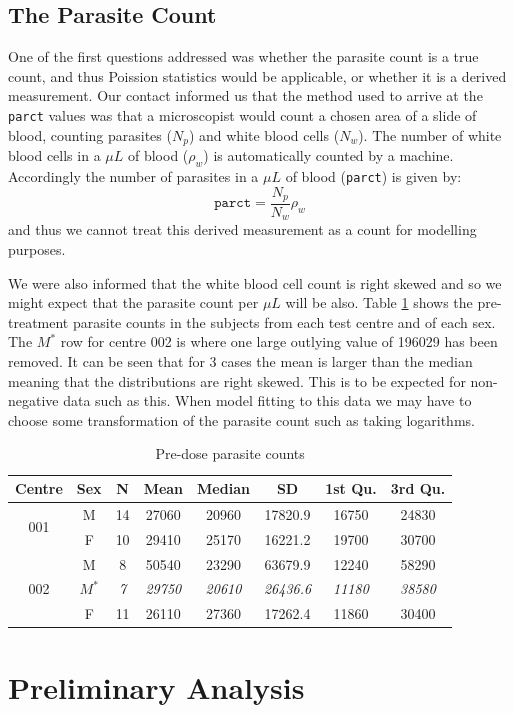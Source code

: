 \subsection{The Parasite Count}
One of the first questions addressed was whether the parasite count is a true count, and thus Poission statistics would be applicable, or whether it is a derived measurement. Our contact informed us that the method used to arrive at the \texttt{parct} values was that a microscopist would count a chosen area of a slide of blood, counting parasites ($N_p$) and white blood cells ($N_w$). The number of white blood cells in a $\mu L$ of blood ($\rho_w$) is automatically counted by a machine. Accordingly the number of parasites in a $\mu L$ of blood (\texttt{parct}) is given by:
$$\mathtt{parct}=\frac{N_p}{N_w}\rho_w$$
and thus we cannot treat this derived measurement as a count for modelling purposes.

We were also informed that the white blood cell count is right skewed and so we might expect that the parasite count per $\mu L$ will be also. Table \ref{predose} shows the pre-treatment parasite counts in the subjects from each test centre and of each sex. The $M^*$ row for centre 002 is where one large outlying value of 196029 has been removed. It can be seen that for 3 cases the mean is larger than the median meaning that the distributions are right skewed. This is to be expected for non-negative data such as this. When model fitting to this data we may have to choose some transformation of the parasite count such as taking logarithms.
\begin{table}[h]
\centering
\caption{Pre-dose parasite counts}\label{predose}
\begin{tabular}{|cc|cccccc|}
\hline
Centre&Sex&N&Mean&Median&SD&1st Qu.&3rd Qu.\\\hline
\multirow{2}{*}{001}&M&14&27060&20960&17820.9&16750&24830\\
&F&10&29410&25170&16221.2&19700&30700\\\hline
\multirow{3}{*}{002}&M&8&50540&23290&63679.9&12240&58290\\
&$M^*$&\textit{7}&\textit{29750}&\textit{20610}&\textit{26436.6}&\textit{11180}&\textit{38580}\\
&F&11&26110&27360&17262.4&11860&30400\\\hline
\end{tabular}
\end{table}
\pagebreak
\section{Preliminary Analysis}
